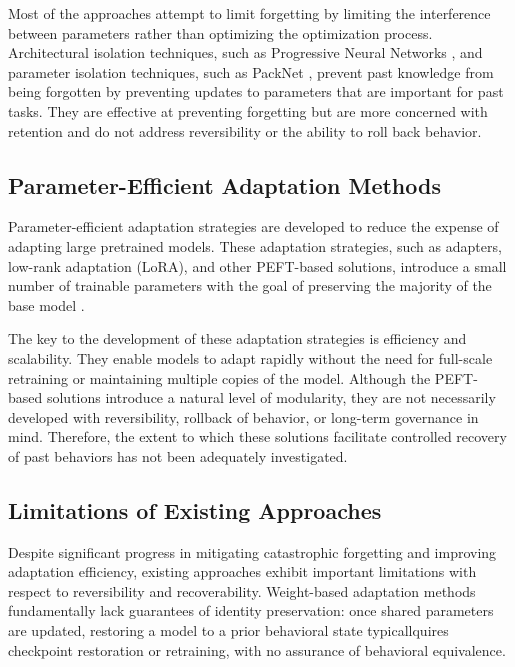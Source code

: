 \documentclass[10pt]{article}
\begin{document}
	Most of the approaches attempt to limit forgetting by limiting the interference between parameters rather than optimizing the optimization process. Architectural isolation techniques, such as Progressive Neural Networks \cite{rusu2016progressive}, and parameter isolation techniques, such as PackNet \cite{mallya2018packnet}, prevent past knowledge from being forgotten by preventing updates to parameters that are important for past tasks. They are effective at preventing forgetting but are more concerned with retention and do not address reversibility or the ability to roll back behavior.
	
	\subsection{Parameter-Efficient Adaptation Methods}
	\label{sec:peft}
	
	Parameter-efficient adaptation strategies are developed to reduce the expense of adapting large pretrained models. These adaptation strategies, such as adapters, low-rank adaptation (LoRA), and other PEFT-based solutions, introduce a small number of trainable parameters with the goal of preserving the majority of the base model \cite{houlsby2019adapter,hu2021lora}.
	
	The key to the development of these adaptation strategies is efficiency and scalability. They enable models to adapt rapidly without the need for full-scale retraining or maintaining multiple copies of the model. Although the PEFT-based solutions introduce a natural level of modularity, they are not necessarily developed with reversibility, rollback of behavior, or long-term governance in mind. Therefore, the extent to which these solutions facilitate controlled recovery of past behaviors has not been adequately investigated.
	
	\subsection{Limitations of Existing Approaches}
	\label{sec:limitations}
	
	Despite significant progress in mitigating catastrophic forgetting and improving adaptation efficiency, existing approaches exhibit important limitations with respect to reversibility and recoverability. Weight-based adaptation methods fundamentally lack guarantees of identity preservation: once shared parameters are updated, restoring a model to a prior behavioral state typicallquires checkpoint restoration or retraining, with no assurance of behavioral equivalence.
	
\end{document}
